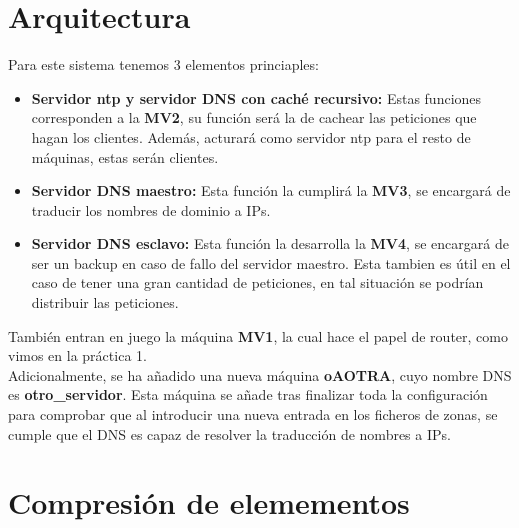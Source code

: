 \documentclass{article}
\begin{document}
\section{Arquitectura}
Para este sistema tenemos 3 elementos princiaples:
\begin{itemize}
	\item\textbf{Servidor ntp y servidor DNS con caché recursivo: } Estas funciones corresponden a la \textbf{MV2}, su función será la de cachear las peticiones que hagan los clientes. Además, acturará como servidor ntp para el resto de máquinas, estas serán clientes.
	\item\textbf{Servidor DNS maestro: } Esta función la cumplirá la \textbf{MV3}, se encargará de traducir los nombres de dominio a IPs.
	\item\textbf{Servidor DNS esclavo: } Esta función la desarrolla la \textbf{MV4}, se encargará de ser un backup en caso de fallo del servidor maestro. Esta tambien es útil en el caso de tener una gran cantidad de peticiones, en tal situación se podrían distribuir las peticiones.
\end{itemize}
También entran en juego la máquina \textbf{MV1}, la cual hace el papel de router, como vimos en la práctica 1.\\
Adicionalmente, se ha añadido una nueva máquina \textbf{oAOTRA}, cuyo nombre DNS es \textbf{otro\_servidor}. Esta máquina se añade tras finalizar toda la configuración para comprobar que al introducir una nueva entrada en los ficheros de zonas, se cumple que el DNS es capaz de resolver la traducción de nombres a IPs.

\section{Compresión de elemementos}
\end{document}
